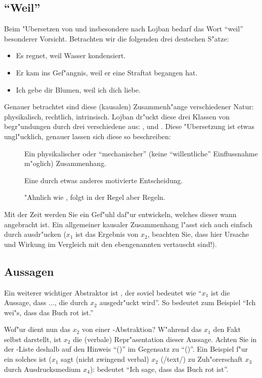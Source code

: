 \subsection{``Weil''}
Beim "Ubersetzen von und insbesondere nach Lojban bedarf das Wort ``weil'' besonderer Vorsicht. Betrachten wir die folgenden drei deutschen
S"atze:
\begin{itemize}
\item Es regnet, weil Wasser kondensiert.
\item Er kam ins Gef"angnis, weil er eine Straftat begangen hat.
\item Ich gebe dir Blumen, weil ich dich liebe.
\end{itemize}
Genauer betrachtet sind diese (kausalen) Zusammenh"ange verschiedener Natur: physikalisch, rechtlich, intrinsisch. Lojban dr"uckt diese drei
Klassen von begr"undungen durch drei verschiedene  aus: ,  und . Diese "Ubersetzung ist etwas ungl"ucklich, genauer lassen sich diese  so beschreiben:
\begin{description}
\item[] Ein physikalischer oder ``mechanischer'' (keine ``willentliche'' Einflussnahme m"oglich) Zusammenhang.
\item[] Eine durch etwas anderes motivierte Entscheidung.
\item[] "Ahnlich wie , folgt in der Regel aber Regeln.
\end{description}
Mit der Zeit werden Sie ein Gef"uhl daf"ur entwickeln, welches dieser  wann angebracht ist. Ein allgemeiner kausaler Zusammenhang
l"asst sich auch einfach durch  ausdr"ucken ($x_1$ ist das Ergebnis von $x_2$, beachten Sie, dass hier Ursache und Wirkung im
Vergleich mit den ebengenannten  vertauscht sind!).

\subsection{Aussagen}
Ein weiterer wichtiger Abstraktor ist , der soviel bedeutet wie ``$x_1$ ist die Aussage, dass ..., die durch $x_2$ ausgedr"uckt wird''.
So bedeutet zum Beispiel  ``Ich wei"s, dass das Buch rot ist.''

Wof"ur dient nun das $x_2$ von einer -Abstraktion? W"ahrend das $x_1$ den Fakt selbst darstellt, ist $x_2$ die (verbale) 
Repr"asentation dieser Aussage. Achten Sie in der -Liste deshalb auf den Hinweis ``()'' im Gegensatz zu ``()''.
Ein Beispiel f"ur ein solches  ist  ($x_1$ sagt (nicht zwingend verbal) $x_2$ (/text/) zu Zuh"orerschaft $x_3$ durch
Ausdrucksmedium $x_4$):  bedeutet ``Ich sage, dass das Buch rot ist''.

